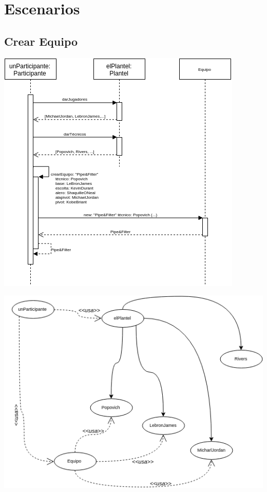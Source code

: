 \section{Escenarios}

\subsection{Crear Equipo}


\includegraphics[width=\textwidth]{imgs/crearEquipoSecuencia.png}

\includegraphics[width=\textwidth]{imgs/crearEquipoObjetos.png}




